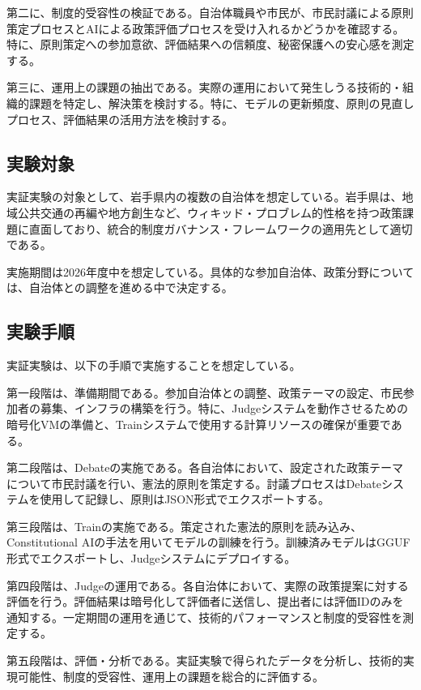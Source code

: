第二に、制度的受容性の検証である。自治体職員や市民が、市民討議による原則策定プロセスとAIによる政策評価プロセスを受け入れるかどうかを確認する。特に、原則策定への参加意欲、評価結果への信頼度、秘密保護への安心感を測定する。

第三に、運用上の課題の抽出である。実際の運用において発生しうる技術的・組織的課題を特定し、解決策を検討する。特に、モデルの更新頻度、原則の見直しプロセス、評価結果の活用方法を検討する。

\subsection{実験対象}

実証実験の対象として、岩手県内の複数の自治体を想定している。岩手県は、地域公共交通の再編や地方創生など、ウィキッド・プロブレム的性格を持つ政策課題に直面しており、統合的制度ガバナンス・フレームワークの適用先として適切である。

実施期間は2026年度中を想定している。具体的な参加自治体、政策分野については、自治体との調整を進める中で決定する。

\subsection{実験手順}

実証実験は、以下の手順で実施することを想定している。

第一段階は、準備期間である。参加自治体との調整、政策テーマの設定、市民参加者の募集、インフラの構築を行う。特に、Judgeシステムを動作させるための暗号化VMの準備と、Trainシステムで使用する計算リソースの確保が重要である。

第二段階は、Debateの実施である。各自治体において、設定された政策テーマについて市民討議を行い、憲法的原則を策定する。討議プロセスはDebateシステムを使用して記録し、原則はJSON形式でエクスポートする。

第三段階は、Trainの実施である。策定された憲法的原則を読み込み、Constitutional AIの手法を用いてモデルの訓練を行う。訓練済みモデルはGGUF形式でエクスポートし、Judgeシステムにデプロイする。

第四段階は、Judgeの運用である。各自治体において、実際の政策提案に対する評価を行う。評価結果は暗号化して評価者に送信し、提出者には評価IDのみを通知する。一定期間の運用を通じて、技術的パフォーマンスと制度的受容性を測定する。

第五段階は、評価・分析である。実証実験で得られたデータを分析し、技術的実現可能性、制度的受容性、運用上の課題を総合的に評価する。

